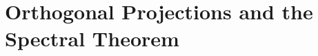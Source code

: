 \section{Orthogonal Projections and the Spectral Theorem}\label{sec:6.6}

\exercisesection

\begin{ex}\label{ex:6.6.9}

\end{ex}

\begin{ex}\label{ex:6.6.10}

\end{ex}
